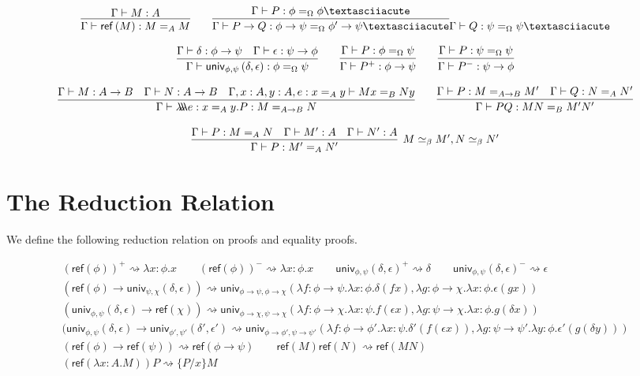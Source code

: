 \documentclass{easychair}
\newcommand{\univ}[4]{\mathsf{univ}_{{#1},{#2}} \left( {#3} , {#4} \right)}
\newcommand{\triplelambda}{\lambda \!\! \lambda \!\! \lambda}
\newcommand{\reff}[1]{\mathsf{ref} \left( {#1} \right)}
\begin{document}
\[ \infer{\Gamma \vdash \reff{M} : M =_A M}{\Gamma \vdash M : A}
\qquad
\infer{\Gamma \vdash P \rightarrow Q : \phi \rightarrow \psi =_\Omega \phi' \rightarrow \psi´}{\Gamma \vdash P : \phi =_\Omega \phi´}{\Gamma \vdash Q : \psi =_\Omega \psi´} \]

\[ \infer{\Gamma \vdash \univ{\phi}{\psi}{\delta}{\epsilon} : \phi =_\Omega \psi}{\Gamma \vdash \delta : \phi \rightarrow \psi \quad \Gamma \vdash \epsilon : \psi \rightarrow \phi} 
\qquad
\infer{\Gamma \vdash P^+ : \phi \rightarrow \psi}{\Gamma \vdash P : \phi =_\Omega \psi}
\qquad
\infer{\Gamma \vdash P^- : \psi \rightarrow \phi}{\Gamma \vdash P : \psi =_\Omega \psi} \]

\[ \infer{\Gamma \vdash \triplelambda e : x =_A y . P : M =_{A \rightarrow B} N}{\Gamma \vdash M : A \rightarrow B \quad \Gamma \vdash N : A \rightarrow B \quad
\Gamma, x : A, y : A, e : x =_A y \vdash M x =_B N y}
\qquad
\infer{\Gamma \vdash PQ : MN =_B M' N'}{\Gamma \vdash P : M =_{A \rightarrow B} M' \quad \Gamma \vdash Q : N =_A N'} \]

\[ \infer[M \simeq_\beta M', N \simeq_\beta N']{\Gamma \vdash P : M' =_A N'}{\Gamma \vdash P : M =_A N \quad \Gamma \vdash M' : A \quad \Gamma \vdash N' : A} \]

\section{The Reduction Relation}

We define the following reduction relation on proofs and equality proofs.

\begin{gather*}
(\reff{\phi})^+ \rightsquigarrow \lambda x : \phi . x
\qquad
(\reff{\phi})^- \rightsquigarrow \lambda x : \phi . x
\qquad
\univ{\phi}{\psi}{\delta}{\epsilon}^+ \rightsquigarrow \delta
\qquad
\univ{\phi}{\psi}{\delta}{\epsilon}^- \rightsquigarrow \epsilon
\\
(\reff \phi \rightarrow \univ{\psi}{\chi}{\delta}{\epsilon}) \rightsquigarrow \univ{\phi \rightarrow \psi}{\phi \rightarrow \chi}{\lambda f : \phi \rightarrow \psi . \lambda x : \phi . \delta (f x)}{\lambda g : \phi \rightarrow \chi . \lambda x : \phi . \epsilon (g x)}
\\
(\univ{\phi}{\psi}{\delta}{\epsilon} \rightarrow \reff{\chi}) \rightsquigarrow \univ{\phi \rightarrow \chi}{\psi \rightarrow \chi}{\lambda f : \phi \rightarrow \chi. \lambda x : \psi . f (\epsilon x)}{\lambda g : \psi \rightarrow \chi . \lambda x : \phi . g (\delta x)}
\\
(\univ{\phi}{\psi}{\delta}{\epsilon} \rightarrow \univ{\phi'}{\psi'}{\delta'}{\epsilon'} \rightsquigarrow \univ{\phi \rightarrow \phi'}{\psi \rightarrow \psi'}
{\lambda f : \phi \rightarrow \phi' . \lambda x : \psi . \delta' (f (\epsilon x))}{\lambda g : \psi \rightarrow \psi' . \lambda y : \phi . \epsilon' (g (\delta y))}
\\
(\reff{\phi} \rightarrow \reff{\psi}) \rightsquigarrow \reff{\phi \rightarrow \psi}
\qquad
\reff{M} \reff{N} \rightsquigarrow \reff{MN}
\\
(\reff{\lambda x:A.M})P \rightsquigarrow \{ P / x \} M
\end{gather*}
\end{document}
